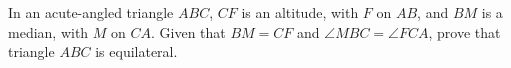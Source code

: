 \documentclass[varwidth]{standalone}
\begin{document}
    In an acute-angled triangle $ABC$, $CF$ is an altitude, with $F$ on $AB$, and $BM$ is a median, with $M$ on $CA$. Given that $BM = CF$ and $\angle MBC = \angle FCA$, prove that triangle $ABC$ is equilateral.
\end{document}
